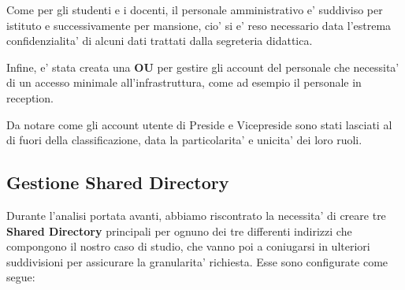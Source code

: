 \documentclass{report}
\begin{document}
				Come per gli studenti e i docenti, il personale amministrativo e' suddiviso per istituto e successivamente
				per mansione, cio' si e' reso necessario data l'estrema confidenzialita' di alcuni dati trattati dalla
				segreteria didattica.

				Infine, e' stata creata una \textbf{OU} per gestire gli account del personale che necessita' di un
				accesso minimale all'infrastruttura, come ad esempio il personale in reception.

				Da notare come gli account utente di Preside e Vicepreside sono stati lasciati al di fuori della
				classificazione, data la particolarita' e unicita' dei loro ruoli.
			\subsection{Gestione Shared Directory}
				Durante l'analisi portata avanti, abbiamo riscontrato la necessita' di creare tre \textbf{Shared 
				Directory} principali per ognuno dei tre differenti indirizzi che compongono il nostro caso
				di studio, che vanno poi a coniugarsi in ulteriori suddivisioni per assicurare la granularita'
				richiesta. Esse sono configurate come segue:
\end{document}
